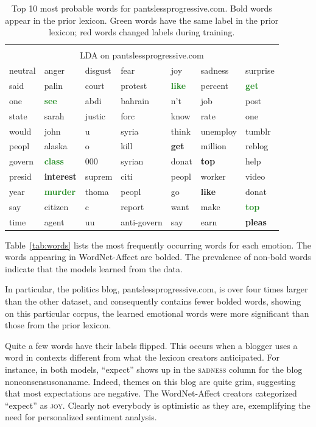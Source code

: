 \documentclass{article}
\begin{document}
\begin{table}
\begin{tabular}{ l l l l l l l  }
\multicolumn{7}{c}{ } \\
\multicolumn{7}{c}{ \sc LDA on pantslessprogressive.com }\\
\sc neutral & \sc anger & \sc disgust & \sc fear & \sc joy & \sc sadness & \sc surprise \\
\hline
said & palin & court & protest & \textcolor{ForestGreen}{\textbf{like}} & percent & \textcolor{ForestGreen}{\textbf{get}} \\
one & \textcolor{ForestGreen}{\textbf{see}} & abdi & bahrain & n't & job & post \\
state & sarah & justic & forc & know & rate & one \\
would & john & u & syria & think & unemploy & tumblr \\
peopl & alaska & o & kill & \textcolor{BrickRed}{\textbf{get}} & million & reblog \\
govern & \textcolor{ForestGreen}{\textbf{class}} & 000 & syrian & donat & \textcolor{BrickRed}{\textbf{top}} & help \\
presid & \textcolor{BrickRed}{\textbf{interest}} & suprem & citi & peopl & worker & video \\
year & \textcolor{ForestGreen}{\textbf{murder}} & thoma & peopl & go & \textcolor{BrickRed}{\textbf{like}} & donat \\
say & citizen & c & report & want & make & \textcolor{ForestGreen}{\textbf{top}} \\
time & agent & uu & anti-govern & say & earn & \textcolor{BrickRed}{\textbf{pleas}} \\
\end{tabular}
\caption{Top 10 most probable words for pantslessprogressive.com. Bold words appear in the prior lexicon. Green words have the same label in the prior lexicon; red words changed labels during training.}
\end{table}

Table~\ref{tab:words} lists the most frequently occurring words for
each emotion. The words appearing in WordNet-Affect are bolded. The
prevalence of non-bold words indicate that the models learned from
the data.

In particular, the politics blog, pantslessprogressive.com, is over
four times larger than the other dataset, and consequently contains
fewer bolded words, showing on this particular corpus, the learned
emotional words were more significant than those from the prior
lexicon.

Quite a few words have their labels flipped. This occurs when a
blogger uses a word in contexts different from what the lexicon
creators anticipated. For instance, in both models, ``expect'' shows
up in the \textsc{sadness} column for the blog nonconsensusonaname.
Indeed, themes on this blog are quite grim, suggesting that most
expectations are negative. The WordNet-Affect creators categorized
``expect'' as \textsc{joy}. Clearly not everybody is optimistic as
they are, exemplifying the need for personalized sentiment analysis.
\end{document}
